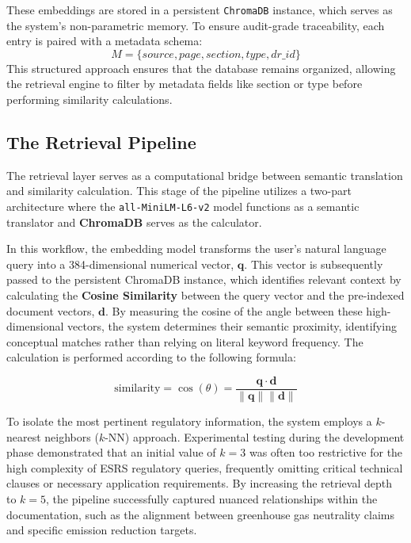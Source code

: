 \documentclass[12pt]{article}
\begin{document}
These embeddings are stored in a persistent \texttt{ChromaDB} instance, which serves as the system's non-parametric memory. To ensure audit-grade traceability, each entry is paired with a metadata schema:
$$M = \{source, page, section, type, dr\_id\}$$
This structured approach ensures that the database remains organized, allowing the retrieval engine to filter by metadata fields like section or type before performing similarity calculations.

\subsection{The Retrieval Pipeline}

The retrieval layer serves as a computational bridge between semantic translation and similarity calculation. This stage of the pipeline utilizes a two-part architecture where the \texttt{all-MiniLM-L6-v2} model functions as a semantic translator and \textbf{ChromaDB} serves as the calculator. 

In this workflow, the embedding model transforms the user's natural language query into a 384-dimensional numerical vector, $\mathbf{q}$. This vector is subsequently passed to the persistent ChromaDB instance, which identifies relevant context by calculating the \textbf{Cosine Similarity} between the query vector and the pre-indexed document vectors, $\mathbf{d}$. By measuring the cosine of the angle between these high-dimensional vectors, the system determines their semantic proximity, identifying conceptual matches rather than relying on literal keyword frequency. The calculation is performed according to the following formula:

\begin{equation}
\text{similarity} = \cos(\theta) = \frac{\mathbf{q} \cdot \mathbf{d}}{\|\mathbf{q}\| \|\mathbf{d}\|}
\end{equation}

To isolate the most pertinent regulatory information, the system employs a $k$-nearest neighbors ($k$-NN) approach. Experimental testing during the development phase demonstrated that an initial value of $k = 3$ was often too restrictive for the high complexity of ESRS regulatory queries, frequently omitting critical technical clauses or necessary application requirements. By increasing the retrieval depth to $k = 5$, the pipeline successfully captured nuanced relationships within the documentation, such as the alignment between greenhouse gas neutrality claims and specific emission reduction targets. 
\end{document}
